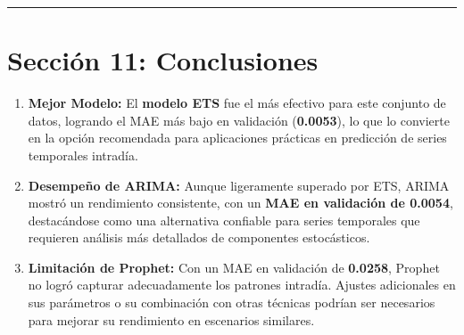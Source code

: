 \documentclass[
]{book}
\begin{document}
\begin{center}\rule{0.5\linewidth}{0.5pt}\end{center}

\section{\texorpdfstring{\textbf{Sección 11: Conclusiones}}{Sección 11: Conclusiones}}\label{secciuxf3n-11-conclusiones}

\begin{enumerate}
\def\labelenumi{\arabic{enumi}.}
\item
  \textbf{Mejor Modelo:} El \textbf{modelo ETS} fue el más efectivo para este conjunto de datos, logrando el MAE más bajo en validación (\textbf{0.0053}), lo que lo convierte en la opción recomendada para aplicaciones prácticas en predicción de series temporales intradía.
\item
  \textbf{Desempeño de ARIMA:} Aunque ligeramente superado por ETS, ARIMA mostró un rendimiento consistente, con un \textbf{MAE en validación de 0.0054}, destacándose como una alternativa confiable para series temporales que requieren análisis más detallados de componentes estocásticos.
\item
  \textbf{Limitación de Prophet:} Con un MAE en validación de \textbf{0.0258}, Prophet no logró capturar adecuadamente los patrones intradía. Ajustes adicionales en sus parámetros o su combinación con otras técnicas podrían ser necesarios para mejorar su rendimiento en escenarios similares.
\end{enumerate}

  
\end{document}

